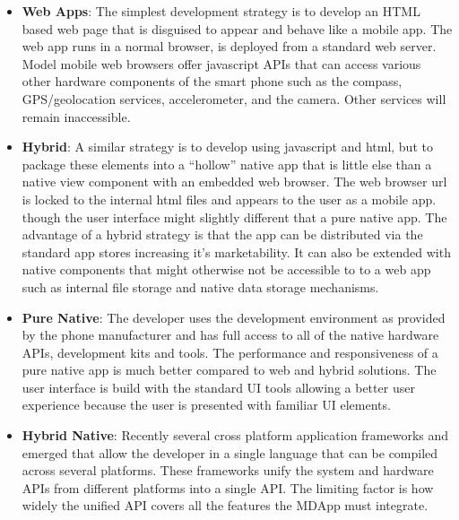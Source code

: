 \begin{itemize}[label={}]

\item \textbf{Web Apps}: The simplest development strategy is to develop an HTML based web page that is disguised to appear and behave like a mobile app. The web app runs in a normal browser, is deployed from a standard web server. Model mobile web browsers offer javascript APIs that can access various other hardware components of the smart phone such as the compass, GPS/geolocation services, accelerometer, and the camera. Other services will remain inaccessible.

\item \textbf{Hybrid}: A similar strategy is to develop using javascript and html, but to package these elements into a “hollow” native app that is little else than a native view component with an embedded web browser. The web browser url is locked to the internal html files and appears to the user as a mobile app. though the user interface might slightly different that a pure native app. The advantage of a hybrid strategy is that the app can be distributed via the standard app stores increasing it’s marketability. It can also be extended with native components that might otherwise not be accessible to to a web app such as internal file storage and native data storage mechanisms.

\item \textbf{Pure Native}: The developer uses the development environment as provided by the phone manufacturer and has full access to all of the native hardware APIs, development kits and tools. The performance and responsiveness of a pure native app is much better compared to web and hybrid solutions. The user interface is build with the standard UI tools allowing a better user experience because the user is presented with familiar UI elements.

\item \textbf{Hybrid Native}: Recently several cross platform application frameworks and emerged that allow the developer in a single language that can be compiled across several platforms. These frameworks unify the system and hardware APIs from different platforms into a single API. The limiting factor is how widely the unified API covers all the features the MDApp must integrate.

\end{itemize}

